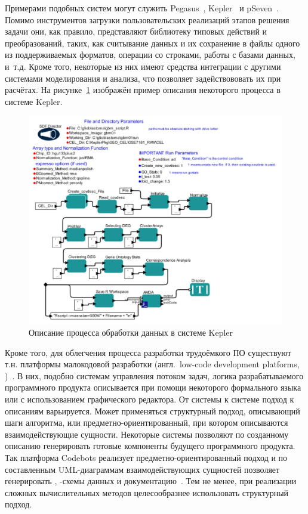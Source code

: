 Примерами подобных систем могут служить Pegasus~\cite{DeelmanPegasus2016}, Kepler~\cite{AltintasKepler2004} и pSeven~\cite{NazarenkoDFM2015}. Помимо инструментов загрузки пользовательских реализаций этапов решения задачи они, как правило, представляют библиотеку типовых действий и преобразований, таких, как считывание данных и их сохранение в файлы одного из поддерживаемых форматов, операции со строками, работы с базами данных, и~т.д. Кроме того, некоторые из них имеют средства интеграции с другими системами моделирования и анализа, что позволяет задействововать их при расчётах. На рисунке~\ref{fig:intro.keplerScreenshot} изображён пример описания некоторого процесса в системе Kepler.
\begin{figure}[!ht]
  \centering
  \includegraphics[height=0.45\textheight]{figures/screenshot.KeplerWorkflow.jpg}
  \caption{Описание процесса обработки данных в системе Kepler}
  \label{fig:intro.keplerScreenshot}
\end{figure}

Кроме того, для облегчения процесса разработки трудоёмкого ПО существуют т.н. платформы малокодовой разработки (англ.~low-code development platforms, )~\cite{DiRuscio2022}. В них, подобно системам управления потоком задач, логика разрабатываемого программного продукта описывается при помощи некоторого формального языка или с использованием графического редактора. От системы к системе подход к описаниям варьируется. Может применяться структурный подход, описывающий шаги алгоритма, или предметно-ориентированный, при котором описываются взаимодействующие сущности. Некоторые системы позволяют по созданному описанию генерировать готовые компоненты будущего программного продукта. Так платформа Codebots реализует предметно-ориентированный подход и по составленным UML-диаграммам взаимодействующих сущностей позволяет генерировать , -схемы данных и документацию~\cite{DiRuscio2022}. Тем не менее, при реализации сложных вычислительных методов целесообразнее использовать структурный подход.


